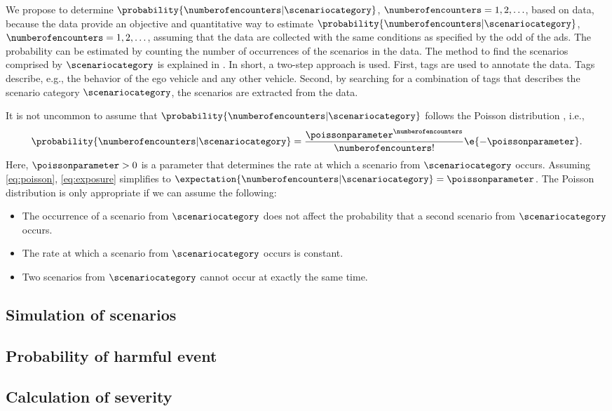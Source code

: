 We propose to determine $\probability{\numberofencounters|\scenariocategory}$, $\numberofencounters=1,2,\ldots$, based on data, because the data provide an objective and quantitative way to estimate $\probability{\numberofencounters|\scenariocategory}$, $\numberofencounters=1,2,\ldots$, assuming that the data are collected with the same conditions as specified by the \ac{odd} of the \ac{ads}.
The probability can be estimated by counting the number of occurrences of the scenarios in the data.
The method to find the scenarios comprised by $\scenariocategory$ is explained in \autocite{degelder2020scenariomining}.
In short, a two-step approach is used.
First, tags are used to annotate the data.
Tags describe, e.g., the behavior of the ego vehicle and any other vehicle.
Second, by searching for a combination of tags that describes the scenario category $\scenariocategory$, the scenarios are extracted from the data.

\begin{remark}
	It is not uncommon to assume that $\probability{\numberofencounters|\scenariocategory}$ follows the Poisson distribution \autocite{nicholson1993accidents, wachenfeld2017new, gyllenhammar2020towards}, i.e., 
	\begin{equation}
		\label{eq:poisson}
		\probability{\numberofencounters|\scenariocategory} = 
		\frac{\poissonparameter^{\numberofencounters}}{\numberofencounters!} \e{-\poissonparameter}.
	\end{equation}
	Here, $\poissonparameter>0$ is a parameter that determines the rate at which a scenario from $\scenariocategory$ occurs.
	Assuming \cref{eq:poisson}, \cref{eq:exposure} simplifies to $\expectation{\numberofencounters|\scenariocategory}=\poissonparameter$.
	The Poisson distribution is only appropriate if we can assume the following:
	\begin{itemize}
		\item The occurrence of a scenario from $\scenariocategory$ does not affect the probability that a second scenario from $\scenariocategory$ occurs.
		\item The rate at which a scenario from $\scenariocategory$ occurs is constant.
		\item Two scenarios from $\scenariocategory$ cannot occur at exactly the same time.
	\end{itemize}
\end{remark}



\subsection{Simulation of scenarios}
\label{sec:simulation}



\subsection{Probability of harmful event}
\label{sec:harmful}



\subsection{Calculation of severity}
\label{sec:severity}
